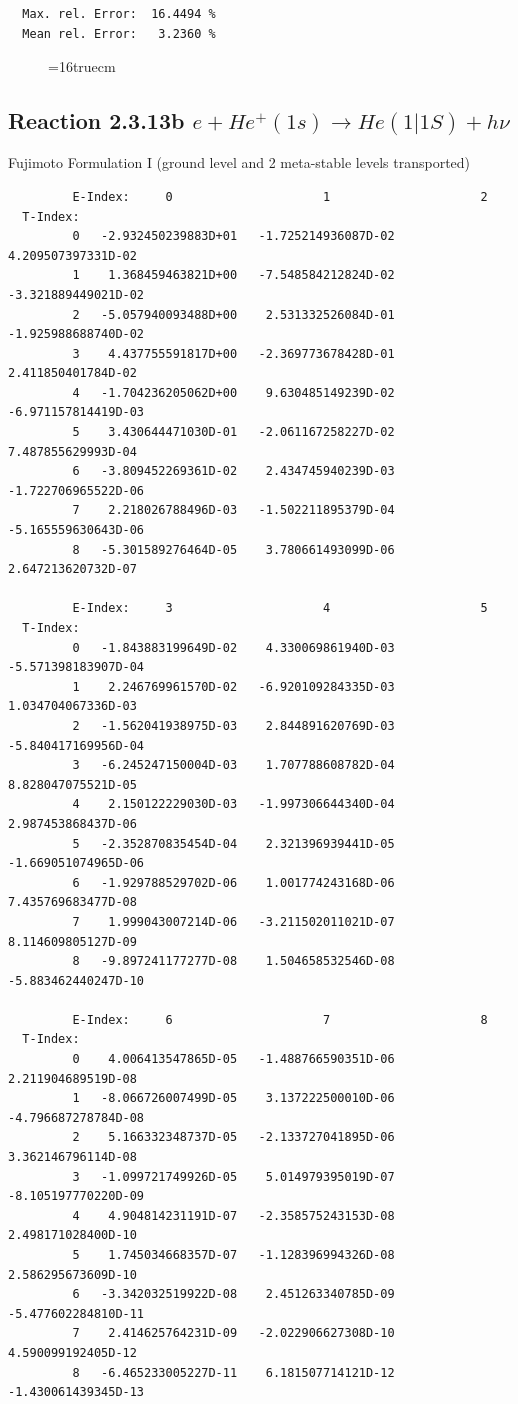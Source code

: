 \documentclass[12pt,dvips]{article}
\begin{document}
\begin{small}
\begin{verbatim}
  Max. rel. Error:  16.4494 %
  Mean rel. Error:   3.2360 %
\end{verbatim}\end{small}
\begin{figure} \label{2.3.13a}
\epsfxsize=16truecm
\end{figure}
\newpage
\subsection{
Reaction 2.3.13b  $e + He^+(1s) \rightarrow He(1|1S) + h\nu$
}

 Fujimoto Formulation I (ground level and 2 meta-stable levels transported)


\begin{small}\begin{verbatim}
         E-Index:     0                     1                     2
  T-Index:
         0   -2.932450239883D+01   -1.725214936087D-02    4.209507397331D-02
         1    1.368459463821D+00   -7.548584212824D-02   -3.321889449021D-02
         2   -5.057940093488D+00    2.531332526084D-01   -1.925988688740D-02
         3    4.437755591817D+00   -2.369773678428D-01    2.411850401784D-02
         4   -1.704236205062D+00    9.630485149239D-02   -6.971157814419D-03
         5    3.430644471030D-01   -2.061167258227D-02    7.487855629993D-04
         6   -3.809452269361D-02    2.434745940239D-03   -1.722706965522D-06
         7    2.218026788496D-03   -1.502211895379D-04   -5.165559630643D-06
         8   -5.301589276464D-05    3.780661493099D-06    2.647213620732D-07

         E-Index:     3                     4                     5
  T-Index:
         0   -1.843883199649D-02    4.330069861940D-03   -5.571398183907D-04
         1    2.246769961570D-02   -6.920109284335D-03    1.034704067336D-03
         2   -1.562041938975D-03    2.844891620769D-03   -5.840417169956D-04
         3   -6.245247150004D-03    1.707788608782D-04    8.828047075521D-05
         4    2.150122229030D-03   -1.997306644340D-04    2.987453868437D-06
         5   -2.352870835454D-04    2.321396939441D-05   -1.669051074965D-06
         6   -1.929788529702D-06    1.001774243168D-06    7.435769683477D-08
         7    1.999043007214D-06   -3.211502011021D-07    8.114609805127D-09
         8   -9.897241177277D-08    1.504658532546D-08   -5.883462440247D-10

         E-Index:     6                     7                     8
  T-Index:
         0    4.006413547865D-05   -1.488766590351D-06    2.211904689519D-08
         1   -8.066726007499D-05    3.137222500010D-06   -4.796687278784D-08
         2    5.166332348737D-05   -2.133727041895D-06    3.362146796114D-08
         3   -1.099721749926D-05    5.014979395019D-07   -8.105197770220D-09
         4    4.904814231191D-07   -2.358575243153D-08    2.498171028400D-10
         5    1.745034668357D-07   -1.128396994326D-08    2.586295673609D-10
         6   -3.342032519922D-08    2.451263340785D-09   -5.477602284810D-11
         7    2.414625764231D-09   -2.022906627308D-10    4.590099192405D-12
         8   -6.465233005227D-11    6.181507714121D-12   -1.430061439345D-13


\end{verbatim}
\end{small}
\end{document}
